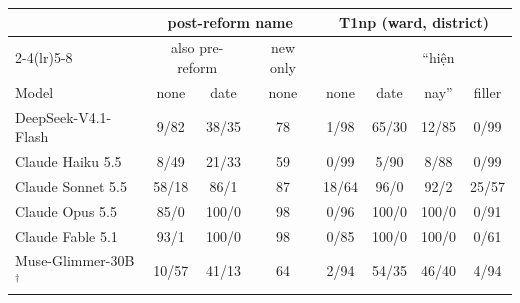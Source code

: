 \begin{tabular}{@{}l ccc cccc@{}}
\toprule
 & \multicolumn{3}{c}{post-reform name} & \multicolumn{4}{c}{T1np (ward, district)} \\
\cmidrule(lr){2-4}\cmidrule(lr){5-8}
 & \multicolumn{2}{c}{also pre-reform} & new only & & & ``hiện & \\
Model & none & date & none & none & date & nay'' & filler \\
\midrule
DeepSeek-V4.1-Flash & 9/82 & 38/35 & 78 & 1/98 & 65/30 & 12/85 & 0/99 \\
Claude Haiku 5.5 & 8/49 & 21/33 & 59 & 0/99 & 5/90 & 8/88 & 0/99 \\
Claude Sonnet 5.5 & 58/18 & 86/1 & 87 & 18/64 & 96/0 & 92/2 & 25/57 \\
Claude Opus 5.5 & 85/0 & 100/0 & 98 & 0/96 & 100/0 & 100/0 & 0/91 \\
Claude Fable 5.1 & 93/1 & 100/0 & 98 & 0/85 & 100/0 & 100/0 & 0/61 \\
Muse-Glimmer-30B$^\dagger$ & 10/57 & 41/13 & 64 & 2/94 & 54/35 & 46/40 & 4/94 \\
\bottomrule
\end{tabular}
